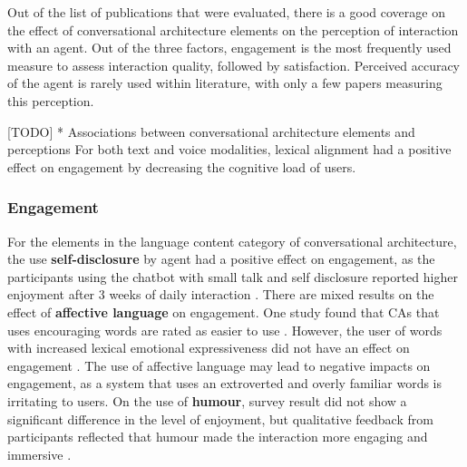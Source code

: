\documentclass[sigconf,screen,review, anonymous]{acmart}
\newcommand{\cmt}[1]{}%
\begin{document}
Out of the list of publications that were evaluated, there is a good coverage on the effect of conversational architecture elements on the perception of interaction with an agent. Out of the three factors, engagement is the most frequently used measure to assess interaction quality, followed by satisfaction. Perceived accuracy of the agent is rarely used within literature, with only a few papers measuring this perception. 

[TODO] * Associations between conversational architecture elements and perceptions
For both text and voice modalities, lexical alignment had a positive effect on engagement by decreasing the cognitive load of users. 

\subsubsection{Engagement}
For the elements in the language content category of conversational architecture, the use \textbf{self-disclosure} by agent had a positive effect on engagement, as the participants using the chatbot with small talk and self disclosure reported higher enjoyment after 3 weeks of daily interaction \cite{lee2020hear}\cmt{[23]}. There are mixed results on the effect of \textbf{affective language} on engagement. One study found that CAs that uses encouraging words are rated as easier to use \cite{healey2013relating}\cmt{[39]}. However, the user of words with increased lexical emotional expressiveness did not have an effect on engagement \cite{zhu2022effects}\cmt{[26]}. The use of affective language may lead to negative impacts on engagement, as a system that uses an extroverted and overly familiar words is irritating to users. On the use of \textbf{humour}, survey result did not show a significant difference in the level of enjoyment, but qualitative feedback from participants reflected that humour made the interaction more engaging and immersive \cite{ceha2021can}\cmt{[57]}.


\end{document}
